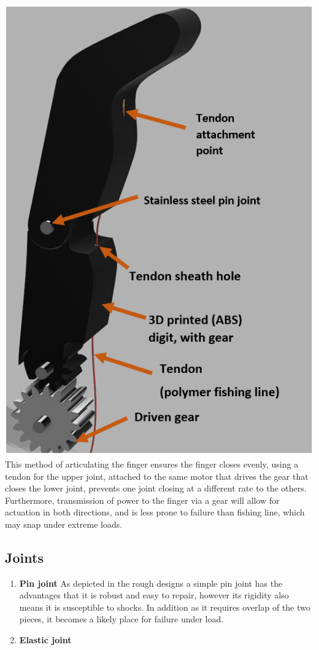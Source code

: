 \documentclass[11pt,3p]{report}
\begin{document}
\begin{multicols}{2}
\begin{enumerate}[noitemsep]
{				\includegraphics[scale=0.5]{gear.PNG}
				This method of articulating the finger ensures the finger closes evenly, using a tendon for the upper joint, attached to the same motor that drives the gear that closes the lower joint, prevents one joint closing at a different rate to the others. Furthermore, transmission of power to the finger via a gear will allow for actuation in both directions, and is less prone to failure than fishing line, which may snap under extreme loads.
			}		
			\end{enumerate}
			
		\subsection{Joints}

 \begin{enumerate}[noitemsep]
        \item \textbf{Pin joint} {
        As depicted in the rough designs a simple pin joint has the advantages that it is robust and easy to repair, however its rigidity also means it is susceptible to shocks. In addition as it requires overlap of the two pieces, it becomes a likely place for failure under load.
        }
        \item \textbf{Elastic joint} {
        
}
\end{enumerate}
\end{multicols}
\end{document}
